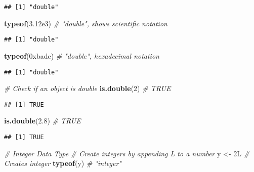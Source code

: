 \documentclass[
]{article}
\newenvironment{Shaded}{\begin{snugshade}}{\end{snugshade}}
\newcommand{\CommentTok}[1]{\textcolor[rgb]{0.56,0.35,0.01}{\textit{#1}}}
\newcommand{\DataTypeTok}[1]{\textcolor[rgb]{0.13,0.29,0.53}{#1}}
\newcommand{\DecValTok}[1]{\textcolor[rgb]{0.00,0.00,0.81}{#1}}
\newcommand{\FloatTok}[1]{\textcolor[rgb]{0.00,0.00,0.81}{#1}}
\newcommand{\FunctionTok}[1]{\textcolor[rgb]{0.13,0.29,0.53}{\textbf{#1}}}
\newcommand{\NormalTok}[1]{#1}
\newcommand{\OtherTok}[1]{\textcolor[rgb]{0.56,0.35,0.01}{#1}}
\begin{document}
\begin{verbatim}
## [1] "double"
\end{verbatim}

\begin{Shaded}
\begin{Highlighting}[]
\FunctionTok{typeof}\NormalTok{(}\FloatTok{3.12e3}\NormalTok{)         }\CommentTok{\# "double", shows scientific notation}
\end{Highlighting}
\end{Shaded}

\begin{verbatim}
## [1] "double"
\end{verbatim}

\begin{Shaded}
\begin{Highlighting}[]
\FunctionTok{typeof}\NormalTok{(}\DecValTok{0xbade}\NormalTok{)         }\CommentTok{\# "double", hexadecimal notation}
\end{Highlighting}
\end{Shaded}

\begin{verbatim}
## [1] "double"
\end{verbatim}

\begin{Shaded}
\begin{Highlighting}[]
\CommentTok{\# Check if an object is double}
\FunctionTok{is.double}\NormalTok{(}\DecValTok{2}\NormalTok{)          }\CommentTok{\# TRUE}
\end{Highlighting}
\end{Shaded}

\begin{verbatim}
## [1] TRUE
\end{verbatim}

\begin{Shaded}
\begin{Highlighting}[]
\FunctionTok{is.double}\NormalTok{(}\FloatTok{2.8}\NormalTok{)        }\CommentTok{\# TRUE}
\end{Highlighting}
\end{Shaded}

\begin{verbatim}
## [1] TRUE
\end{verbatim}

\begin{Shaded}
\begin{Highlighting}[]
\CommentTok{\# Integer Data Type}
\CommentTok{\# Create integers by appending L to a number}
\NormalTok{y }\OtherTok{\textless{}{-}} \DecValTok{2}\DataTypeTok{L}                \CommentTok{\# Creates integer}
\FunctionTok{typeof}\NormalTok{(y)              }\CommentTok{\# "integer"}
\end{Highlighting}
\end{Shaded}
\end{document}
